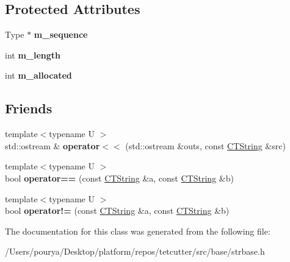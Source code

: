 \subsection*{Protected Attributes}
\begin{DoxyCompactItemize}
\item 
\hypertarget{classps_1_1CTString_ad669bffe6b3cd7cc8fd50f99ade3ecf4}{}Type $\ast$ {\bfseries m\+\_\+sequence}\label{classps_1_1CTString_ad669bffe6b3cd7cc8fd50f99ade3ecf4}

\item 
\hypertarget{classps_1_1CTString_afd720bdfc4e04286fcb45a0774c09fa6}{}int {\bfseries m\+\_\+length}\label{classps_1_1CTString_afd720bdfc4e04286fcb45a0774c09fa6}

\item 
\hypertarget{classps_1_1CTString_a6476626cbb2835b189ba3241df00243e}{}int {\bfseries m\+\_\+allocated}\label{classps_1_1CTString_a6476626cbb2835b189ba3241df00243e}

\end{DoxyCompactItemize}
\subsection*{Friends}
\begin{DoxyCompactItemize}
\item 
\hypertarget{classps_1_1CTString_a17db055887928931a33d69fc13518bb9}{}{\footnotesize template$<$typename U $>$ }\\std\+::ostream \& {\bfseries operator$<$$<$} (std\+::ostream \&outs, const \hyperlink{classps_1_1CTString}{C\+T\+String} \&src)\label{classps_1_1CTString_a17db055887928931a33d69fc13518bb9}

\item 
\hypertarget{classps_1_1CTString_a5a56ae5d6e02a9d2959b293cbe387ec0}{}{\footnotesize template$<$typename U $>$ }\\bool {\bfseries operator==} (const \hyperlink{classps_1_1CTString}{C\+T\+String} \&a, const \hyperlink{classps_1_1CTString}{C\+T\+String} \&b)\label{classps_1_1CTString_a5a56ae5d6e02a9d2959b293cbe387ec0}

\item 
\hypertarget{classps_1_1CTString_ac669f7df14173085ee723f2c9a1aad99}{}{\footnotesize template$<$typename U $>$ }\\bool {\bfseries operator!=} (const \hyperlink{classps_1_1CTString}{C\+T\+String} \&a, const \hyperlink{classps_1_1CTString}{C\+T\+String} \&b)\label{classps_1_1CTString_ac669f7df14173085ee723f2c9a1aad99}

\end{DoxyCompactItemize}


The documentation for this class was generated from the following file\+:\begin{DoxyCompactItemize}
\item 
/\+Users/pourya/\+Desktop/platform/repos/tetcutter/src/base/strbase.\+h\end{DoxyCompactItemize}
